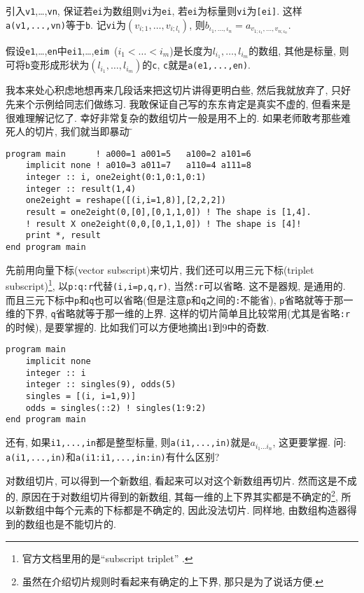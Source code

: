 引入\texttt{v1},\dots ,\texttt{vn}, 保证若\texttt{ei}为数组则\texttt{vi}为\texttt{ei}, 若\texttt{ei}为标量则\texttt{vi}为\texttt{[ei]}. 这样\texttt{a(v1,...,vn)}等于\texttt{b}. 记\texttt{vi}为$(v_{i;1},\dots,v_{i;{l_i}})$, 则$b_{{\iota_1},\dots,{\iota_n}}=a_{{v_{1;\iota_1}},\dots,{v_{n;\iota_n}}}$.

假设\texttt{e1},\dots ,\texttt{en}中\texttt{ei1},\dots ,\texttt{eim}\ ($i_1\!<\!\dots\!<\!i_m$)是长度为$l_{i_1},\dots,l_{i_m}$的数组, 其他是标量, 则可将\texttt{b}变形成形状为$(l_{i_1},\dots,l_{i_m})$的\texttt{c}, \texttt{c}就是\texttt{a(e1,...,en)}.

我本来处心积虑地想再来几段话来把这切片讲得更明白些, 然后我就放弃了, 只好先来个示例给同志们做练习. 我敢保证自己写的东东肯定是真实不虚的, 但看来是很难理解记忆了. 幸好非常复杂的数组切片一般是用不上的. 如果老师敢考那些难死人的切片, 我们就当即暴动$\!\text{\~{}}$
\begin{lstlisting}
program main      ! a000=1 a001=5   a100=2 a101=6
    implicit none ! a010=3 a011=7   a110=4 a111=8
    integer :: i, one2eight(0:1,0:1,0:1)
    integer :: result(1,4)
    one2eight = reshape([(i,i=1,8)],[2,2,2])
    result = one2eight(0,[0],[0,1,1,0]) ! The shape is [1,4].
    ! result X one2eight(0,0,[0,1,1,0]) ! The shape is [4]!
    print *, result
end program main
\end{lstlisting}

先前用向量下标(vector subscript)来切片, 我们还可以用三元下标(triplet subscript)\footnote{
官方文档里用的是``subscript triplet'' .
}, 以\texttt{p:q:r}代替\texttt{(i,i=p,q,r)}, 当然\texttt{:r}可以省略. 这不是器规, 是通用的. 而且三元下标中\texttt{p}和\texttt{q}也可以省略(但是注意\texttt{p}和\texttt{q}之间的\texttt{:}不能省), \texttt{p}省略就等于那一维的下界, \texttt{q}省略就等于那一维的上界. 这样的切片简单且比较常用(尤其是省略\texttt{:r}的时候), 是要掌握的. 比如我们可以方便地摘出$1$到$9$中的奇数.
\begin{lstlisting}
program main
    implicit none
    integer :: i
    integer :: singles(9), odds(5)
    singles = [(i, i=1,9)]
    odds = singles(::2) ! singles(1:9:2)
end program main
\end{lstlisting}
还有, 如果\texttt{i1,...,in}都是整型标量, 则\texttt{a(i1,...,in)}就是$a_{i_1\dots i_n}$, 这更要掌握. 问: \texttt{a(i1,...,in)}和\texttt{a(i1:i1,...,in:in)}有什么区别?

对数组切片, 可以得到一个新数组, 看起来可以对这个新数组再切片. 然而这是不成的, 原因在于对数组切片得到的新数组, 其每一维的上下界其实都是不确定的\footnote{
虽然在介绍切片规则时看起来有确定的上下界, 那只是为了说话方便.
}, 所以新数组中每个元素的下标都是不确定的, 因此没法切片. 同样地, 由数组构造器得到的数组也是不能切片的.

